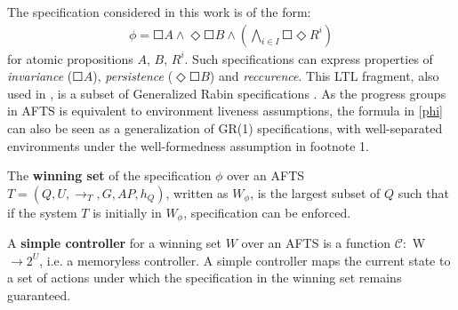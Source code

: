 
The specification considered in this work is of the form:
\begin{align}
\phi = \Square A \wedge \Diamond \Square B \wedge \left( \bigwedge_{i\in I} \Square \Diamond R^i\right)\label{phi}
\end{align}
for atomic propositions $A$, $B$, $R^i$. Such specifications can express properties of \emph{invariance} ($\Square A$), \emph{persistence} ($\Diamond \Square B$) and \emph{reccurence}. This LTL fragment, also used in \cite{wolff2013efficient,Nilsson2017}, is a subset of Generalized Rabin specifications \cite{ehlers2017supervisory}. As the progress groups in AFTS is equivalent to environment liveness assumptions, the formula in \eqref{phi} can also be seen as a generalization of GR(1) specifications, with well-separated environments \cite{klein2010revisiting, maoz2016well,schmuckrelation} under the well-formedness assumption in footnote 1.


\begin{definition}
	The \textbf{winning set} of the specification $ \phi $ over an AFTS $ T = (Q, U, \rightarrow_T, G, AP, h_Q) $, written as $ W_{\phi} $, is the largest subset of $ Q $ such that if the system $ T $ is initially in $ W_{\phi} $, specification can be enforced.
\end{definition}

\begin{definition}
	A \textbf{simple controller} for a winning set $ W $ over an AFTS is a function $ \mathcal{C}: $ W $ \rightarrow 2^U $, i.e. a memoryless controller. A simple controller maps the current state to a set of actions under which the specification in the winning set remains guaranteed.
	\label{def:simp}
\end{definition}

